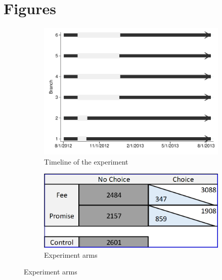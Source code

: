 \documentclass[11pt]{article}
\begin{document}
\newpage
\section{Figures}


\begin{figure}[H]
     \caption{Experiment description}
    \label{exp_description}
    \begin{center}
    \begin{subfigure}{.50\textwidth}
      \caption{Timeline of the experiment}
        \centering
        \includegraphics[width=\textwidth]{Figuras/timeline_suc_exp_extended.pdf}
    \end{subfigure}
    \begin{subfigure}{0.45\textwidth}
    \caption{Experiment arms}
       \centering
      \includegraphics[width=\textwidth]{Figuras/exp_arms.PNG}
    \end{subfigure}
    \end{center}

\end{figure}
\end{document}

